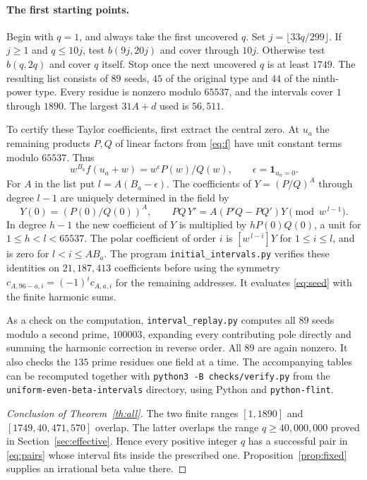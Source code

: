 \documentclass[11pt]{article}
\numberwithin{equation}{section}
\begin{document}
\paragraph{The first starting points.}
Begin with \(q=1\), and always take the first uncovered \(q\).
Set \(j=\lfloor33q/299\rfloor\). If \(j\ge1\) and \(q\le10j\),
test \(b(9j,20j)\) and cover through \(10j\). Otherwise test
\(b(q,2q)\) and cover \(q\) itself. Stop once the next uncovered
\(q\) is at least \(1749\). The resulting list consists of \(89\)
seeds, \(45\) of the original type and \(44\) of the ninth-power
type. Every residue is nonzero modulo \(65537\), and the intervals
cover \(1\) through \(1890\). The largest \(31A+d\) used is \(56{,}511\).

To certify these Taylor coefficients, first extract the central zero.
At \(u_a\) the remaining products \(P,Q\) of linear factors from
\eqref{eq:f} have unit constant terms modulo \(65537\). Thus
\[
 w^{B_a}f(u_a+w)=w^\epsilon P(w)/Q(w),
 \qquad \epsilon=\mathbf 1_{u_a=0}.
\]
For \(A\) in the list put \(l=A(B_a-\epsilon)\). The
coefficients of \(Y=(P/Q)^A\) through degree \(l-1\) are uniquely
determined in the field by
\[
  Y(0)=(P(0)/Q(0))^A,\qquad
  P Q\,Y'=A(P'Q-PQ')Y \pmod{w^{\,l-1}} .
\]
In degree \(h-1\) the new coefficient of \(Y\) is multiplied by
\(hP(0)Q(0)\), a unit for \(1\le h<l<65537\).
The polar coefficient of order \(i\) is \([w^{\,l-i}]Y\) for
\(1\le i\le l\), and is zero for \(l<i\le AB_a\).
The program \texttt{initial\_intervals.py} verifies these identities
on \(21{,}187{,}413\) coefficients before using the symmetry
\(c_{A,96-a,i}=(-1)^i c_{A,a,i}\) for the remaining addresses.
It evaluates \eqref{eq:seed} with the finite harmonic sums.

As a check on the computation, \texttt{interval\_replay.py} computes
all \(89\) seeds modulo a second prime, \(100003\), expanding every
contributing pole directly and summing the harmonic correction in
reverse order. All \(89\) are again nonzero. It also checks the \(135\)
prime residues one field at a time. The accompanying tables can be
recomputed together with \texttt{python3 -B checks/verify.py} from the
\texttt{uniform-even-beta-intervals} directory, using Python and
\texttt{python-flint}.

\begin{proof}[Conclusion of Theorem~\ref{th:all}]
The two finite ranges \([1,1890]\) and \([1749,40{,}471{,}570]\)
overlap. The latter overlaps the range \(q\ge40{,}000{,}000\)
proved in Section~\ref{sec:effective}. Hence every positive integer
\(q\) has a successful pair in \eqref{eq:pairs} whose interval fits
inside the prescribed one. Proposition~\ref{prop:fixed} supplies an
irrational beta value there.
\end{proof}
\end{document}
